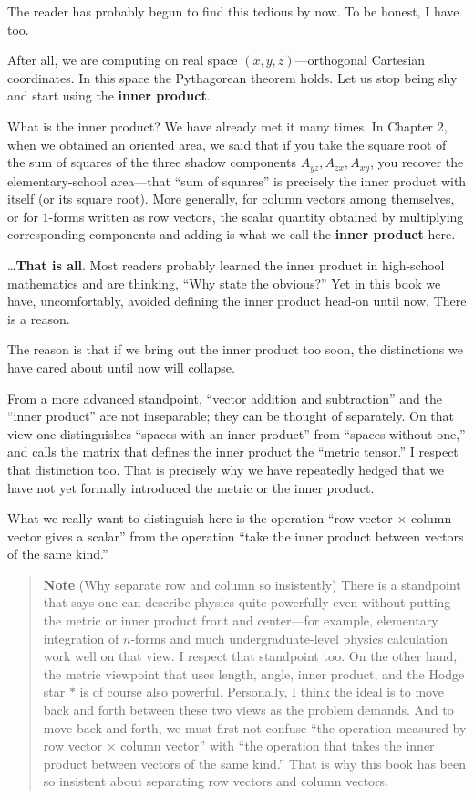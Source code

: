 \documentclass[a4paper,12pt,openany]{book}
\begin{document}
The reader has probably begun to find this tedious by now. To be honest,
I have too.

After all, we are computing on real space \((x,y,z)\)—orthogonal
Cartesian coordinates. In this space the Pythagorean theorem holds. Let
us stop being shy and start using the \textbf{inner product}.

What is the inner product? We have already met it many times. In Chapter
2, when we obtained an oriented area, we said that if you take the
square root of the sum of squares of the three shadow components
\(A_{yz}, A_{zx}, A_{xy}\), you recover the elementary-school
area—that ``sum of squares'' is precisely the inner product with
itself (or its square root). More generally, for column vectors among
themselves, or for \(1\)-forms written as row vectors, the scalar
quantity obtained by multiplying corresponding components and adding is
what we call the \textbf{inner product} here.

\ldots{}\textbf{That is all}. Most readers probably learned the inner
product in high-school mathematics and are thinking, ``Why state the
obvious?'' Yet in this book we have, uncomfortably, avoided defining the
inner product head-on until now. There is a reason.

The reason is that if we bring out the inner product too soon, the
distinctions we have cared about until now will collapse.

From a more advanced standpoint, ``vector addition and subtraction'' and
the ``inner product'' are not inseparable; they can be thought of
separately. On that view one distinguishes ``spaces with an inner
product'' from ``spaces without one,'' and calls the matrix that defines
the inner product the ``metric tensor.'' I respect that distinction too.
That is precisely why we have repeatedly hedged that we have not yet
formally introduced the metric or the inner product.

What we really want to distinguish here is the operation ``row vector ×
column vector gives a scalar'' from the operation ``take the inner
product between vectors of the same kind.''

\begin{quote}
\textbf{Note} (Why separate row and column so insistently) There is a
standpoint that says one can describe physics quite powerfully even
without putting the metric or inner product front and center—for
example, elementary integration of \(n\)-forms and much
undergraduate-level physics calculation work well on that view. I
respect that standpoint too. On the other hand, the metric viewpoint
that uses length, angle, inner product, and the Hodge star \(\ast\) is
of course also powerful. Personally, I think the ideal is to move back
and forth between these two views as the problem demands. And to move
back and forth, we must first not confuse ``the operation measured by
row vector × column vector'' with ``the operation that takes the inner
product between vectors of the same kind.'' That is why this book has
been so insistent about separating row vectors and column vectors.
\end{quote}
\end{document}
